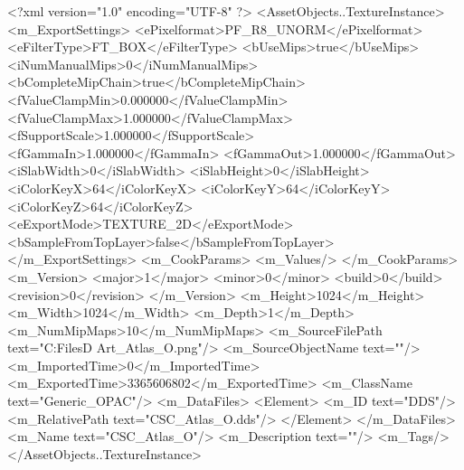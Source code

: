 <?xml version="1.0" encoding="UTF-8" ?>
<AssetObjects..TextureInstance>
	<m_ExportSettings>
		<ePixelformat>PF_R8_UNORM</ePixelformat>
		<eFilterType>FT_BOX</eFilterType>
		<bUseMips>true</bUseMips>
		<iNumManualMips>0</iNumManualMips>
		<bCompleteMipChain>true</bCompleteMipChain>
		<fValueClampMin>0.000000</fValueClampMin>
		<fValueClampMax>1.000000</fValueClampMax>
		<fSupportScale>1.000000</fSupportScale>
		<fGammaIn>1.000000</fGammaIn>
		<fGammaOut>1.000000</fGammaOut>
		<iSlabWidth>0</iSlabWidth>
		<iSlabHeight>0</iSlabHeight>
		<iColorKeyX>64</iColorKeyX>
		<iColorKeyY>64</iColorKeyY>
		<iColorKeyZ>64</iColorKeyZ>
		<eExportMode>TEXTURE_2D</eExportMode>
		<bSampleFromTopLayer>false</bSampleFromTopLayer>
	</m_ExportSettings>
	<m_CookParams>
		<m_Values/>
	</m_CookParams>
	<m_Version>
		<major>1</major>
		<minor>0</minor>
		<build>0</build>
		<revision>0</revision>
	</m_Version>
	<m_Height>1024</m_Height>
	<m_Width>1024</m_Width>
	<m_Depth>1</m_Depth>
	<m_NumMipMaps>10</m_NumMipMaps>
	<m_SourceFilePath text="C:\Users\Shadow\Desktop\Working Files\3D Art\Textures\CSC_Atlas_O.png"/>
	<m_SourceObjectName text=""/>
	<m_ImportedTime>0</m_ImportedTime>
	<m_ExportedTime>3365606802</m_ExportedTime>
	<m_ClassName text="Generic_OPAC"/>
	<m_DataFiles>
		<Element>
			<m_ID text="DDS"/>
			<m_RelativePath text="CSC_Atlas_O.dds"/>
		</Element>
	</m_DataFiles>
	<m_Name text="CSC_Atlas_O"/>
	<m_Description text=""/>
	<m_Tags/>
</AssetObjects..TextureInstance>


